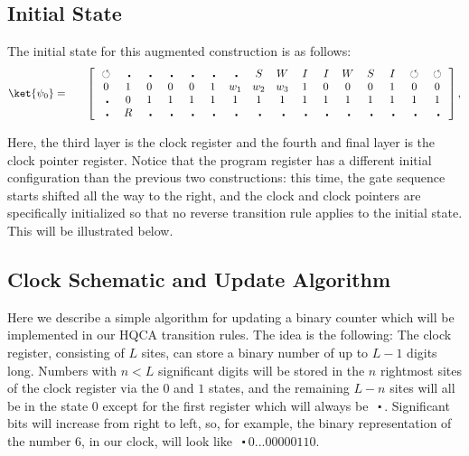 \documentclass[11pt,letterpaper]{article}
\newcommand{\<}{\langle}
\renewcommand{\>}{\rangle}
\newcommand{\tur}{\,\circlearrowleft\,}   %
\newcommand{\bul}{\:\:\centerdot\:}       %
\newcommand{\iga}{\:I\,}                  %
\newcommand{\wga}{W}						%
\newcommand{\sga}{\:S\,}					%
\begin{document}
\subsection{Initial State}

The initial state for this augmented construction is as follows:
\begin{eqnarray}
	\ket{\psi_{0}} &=& \quad \left[ \begin{array}{cccccccccccccccc}
		\tur & \bul &
		\bul & \bul & \bul & \bul & \bul & \sga & \wga & \iga & \iga & 
		\wga & \sga & \iga & \tur & \tur
		\\		
		0 & 1    & 0    & 0    & 0    & 1    & 
		w_1 & w_2 & w_3
		 &
		1    & 0    & 0    & 0    & 1	& 0	& 0
		\\
		\bul & 0 & 1 & 1 & 1 & 1 & 1 & 1 & 1 & 1 & 1 & 1 & 1 & 1 & 1 & 1
		\\
		\bul & R & \bul & \bul & \bul & \bul & \bul & \bul & \bul & \bul & \bul & \bul & \bul & \bul & \bul & \bul
 	\end{array} \right], \label{psi03}
\end{eqnarray}

Here, the third layer is the clock register and the fourth and final layer is the clock pointer register. Notice that the program register has a different initial configuration than the previous two constructions: this time, the gate sequence starts shifted all the way to the right, and the clock and clock pointers are specifically initialized so that no reverse transition rule applies to the initial state. This will be illustrated below.

\subsection{Clock Schematic and Update Algorithm}

Here we describe a simple algorithm for updating a binary counter which will be implemented in our HQCA transition rules. The idea is the following: The clock register, consisting of $L$ sites, can store a binary number of up to $L-1$ digits long. Numbers with $n<L$ significant digits will be stored in the $n$ rightmost sites of the clock register via the $0$ and $1$ states, and the remaining $L-n$ sites will all be in the state $0$ except for the first register which will always be $\bul$. Significant bits will increase from right to left, so, for example, the binary representation of the number 6, in our clock, will look like $\bul 0...00000110$.
\end{document}
